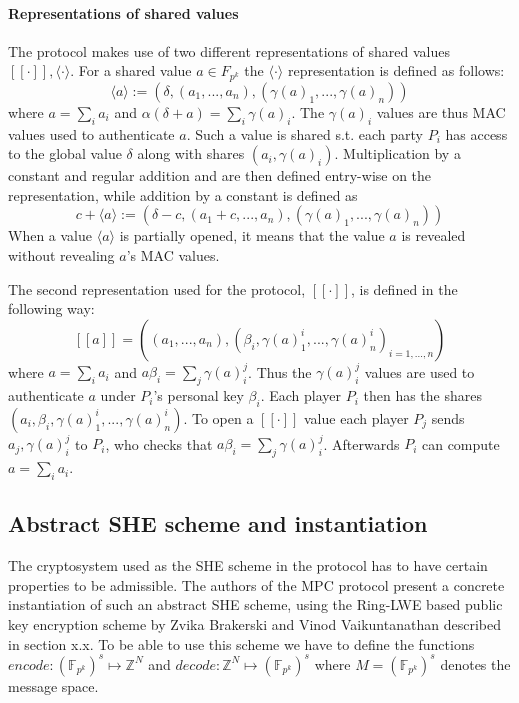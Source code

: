 \documentclass{article}
\begin{document}
\paragraph{Representations of shared values}
The protocol makes use of two different representations of shared values $[\![ \cdot ]\!], \langle \cdot \rangle$. For a shared value $a \in F_{p^k}$ the $\langle \cdot \rangle$ representation is defined as follows:
$$\langle a \rangle := (\delta, (a_1, ..., a_n), (\gamma(a)_1, ..., \gamma(a)_n))$$
where $a = \sum_i a_i$ and $\alpha (\delta + a) = \sum_i \gamma(a)_i$. The $\gamma(a)_i$ values are thus MAC values used to authenticate $a$. Such a value is shared s.t. each party $P_i$ has access to the global value $\delta$ along with shares $(a_i, \gamma(a)_i)$. Multiplication by a constant and regular addition and  are then defined entry-wise on the representation, while addition by a constant is defined as $$c + \langle a \rangle := (\delta - c, (a_1 + c, ..., a_n), (\gamma(a)_1, ..., \gamma(a)_n))$$
When a value $\langle a \rangle$ is partially opened, it means that the value $a$ is revealed without revealing $a$'s MAC values.

The second representation used for the protocol, $[\![ \cdot ]\!]$, is defined in the following way:
$$[\![ a ]\!] = ((a_1, ..., a_n), (\beta_i, \gamma(a)^i_1, ..., \gamma(a)^i_n)_{i = 1, ..., n})$$
where $a = \sum_i a_i$ and $a\beta_i = \sum_j \gamma(a)^j_i$. Thus the $\gamma(a)^j_i$ values are used to authenticate $a$ under $P_i$'s personal key $\beta_i$. Each player $P_i$ then has the shares $(a_i, \beta_i, \gamma(a)^i_1, ..., \gamma(a)^i_n)$. To open a $[\![ \cdot ]\!]$ value each player $P_j$ sends $a_j, \gamma(a)^j_i$ to $P_i$, who checks that $a\beta_i = \sum_j \gamma(a)^j_i$. Afterwards $P_i$ can compute $a = \sum_i a_i$.

\subsection{Abstract SHE scheme and instantiation}
The cryptosystem used as the SHE scheme in the protocol has to have certain properties to be admissible. The authors of the MPC protocol present a concrete instantiation of such an abstract SHE scheme, using the Ring-LWE based public key encryption scheme by Zvika Brakerski and Vinod Vaikuntanathan \cite{brakerski2011fully} described in section x.x. To be able to use this scheme we have to define the functions $encode: (\mathbb{F}_{p^k})^s \mapsto \mathbb{Z}^N$ and $decode: \mathbb{Z}^N \mapsto (\mathbb{F}_{p^k})^s$ where $M = (\mathbb{F}_{p^k})^s$ denotes the message space.
\end{document}
